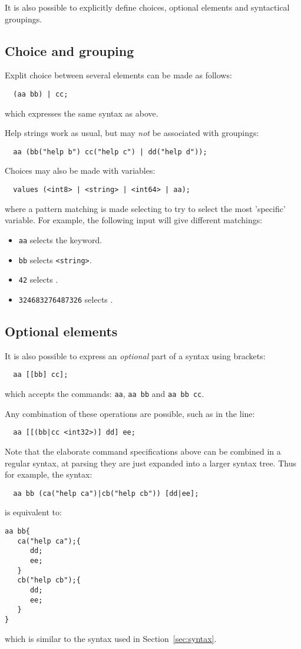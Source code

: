 \documentclass[a4paper, 10pt] {article}
\begin{document}
It is also possible to explicitly define choices, optional elements and syntactical groupings.

\subsection{Choice and grouping}
Explit choice between several elements can be made as follows:
\begin{verbatim}
  (aa bb) | cc;
\end{verbatim}
which expresses the same syntax as above.

Help strings work as usual, but may \emph{not} be associated with
groupings:
\begin{verbatim}
  aa (bb("help b") cc("help c") | dd("help d"));
\end{verbatim}

Choices may also be made with variables:
\begin{verbatim}
  values (<int8> | <string> | <int64> | aa);
\end{verbatim}

where a pattern matching is made selecting to try to select the most 'specific'
variable. For example, the following input will give different matchings:
\begin{itemize}
\item
{\tt aa} selects the keyword.
\item
{\tt bb} selects {\tt <string>}.
\item
{\tt 42} selects {\tt <int8>}.
\item
{\tt 324683276487326} selects {\tt <int64>}.
\end{itemize} 

\subsection{Optional elements}
It is also possible to express an \emph{optional} part of a syntax
using brackets:
\begin{verbatim}
  aa [[bb] cc];
\end{verbatim}
which accepts the commands: {\tt aa}, {\tt aa bb} and  {\tt aa bb cc}.

Any combination of these operations are possible, such as in the line:
\begin{verbatim}
  aa [[(bb|cc <int32>)] dd] ee;
\end{verbatim}

Note that the elaborate command specifications above can be combined
in a regular syntax, at parsing they are just expanded into a larger
syntax tree. 
Thus for example, the syntax:
\begin{verbatim}
  aa bb (ca("help ca")|cb("help cb")) [dd|ee];
\end{verbatim}
is equivalent to:
\begin{verbatim}
aa bb{
   ca("help ca");{
      dd;
      ee;
   }
   cb("help cb");{
      dd;
      ee;
   }
}
\end{verbatim}
which is similar to the syntax used in Section~\ref{sec:syntax}.
\end{document}
